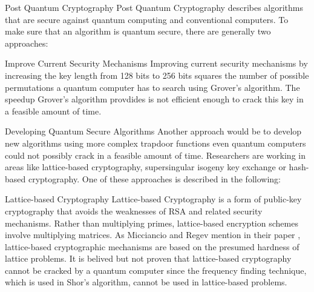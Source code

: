 \documentclass[aps,preprintnumbers,twocolumn]{revtex4}
\begin{document}
\begin{section}{Post Quantum Cryptography}
Post Quantum Cryptography describes algorithms that are secure against quantum computing and conventional computers. To make sure that an algorithm is quantum secure, there are generally two approaches: 
\begin{subsection}{Improve Current Security Mechanisms}    
Improving current security mechanisms by increasing the key length from 128 bits to 256 bits squares the number of possible permutations a quantum computer has to search using Grover's algorithm. 
The speedup Grover's algorithm provdides is not efficient enough to crack this key in a feasible amount of time.
\end{subsection}

\begin{subsection}{Developing Quantum Secure Algorithms}
Another approach would be to develop new algorithms using more complex trapdoor functions even quantum computers could not possibly crack in a feasible amount of time. 
Researchers are working in areas like lattice-based cryptography, supersingular isogeny key exchange or hash-based cryptography. One of these approaches is described in the following: 

\begin{subsubsection}{Lattice-based Cryptography}
Lattice-based Cryptography is a form of public-key cryptography that avoids the weaknesses of RSA and related security mechanisms. 
Rather than multiplying primes, lattice-based encryption schemes involve multiplying matrices. 
As Micciancio and Regev mention in their paper \cite[p.2]{Micciancio2009}, 
lattice-based cryptographic mechanisms are based on the presumed hardness of lattice problems. It is belived but not proven that lattice-based cryptography cannot be cracked by a quantum computer since the frequency finding technique,
which is used in Shor's algorithm, cannot be used in lattice-based problems. 
\end{subsubsection}

\end{subsection}


\end{section}
\end{document}
